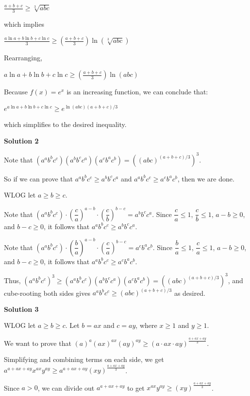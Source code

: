 \begin{enumerate}
 $\frac{a+b+c}{3}\ge \sqrt[3]{abc}$

 which implies

 $\frac{a\ln{a}+b\ln{b}+c\ln{c}}{3}\ge \left(\frac{a+b+c}{3}\right)\ln\left(\sqrt[3]{abc}\right)$

 Rearranging,

 $a\ln{a}+b\ln{b}+c\ln{c}\ge\left(\frac{a+b+c}{3}\right)\ln\left(abc\right)$

 Because $f(x) = e^x$ is an increasing function, we can conclude that:

 $e^{a\ln{a}+b\ln{b}+c\ln{c}}\ge{e}^{\ln\left(abc\right)(a+b+c)/3}$

 which simplifies to the desired inequality.

 



\textbf{Solution 2}

Note that $(a^ab^bc^c)(a^bb^cc^a)(a^cb^ac^b)=\left((abc)^{(a+b+c)/3}\right)^3$.

 So if we can prove that $a^ab^bc^c\ge a^bb^cc^a$ and $a^ab^bc^c\ge a^cb^ac^b$, then we are done.

 WLOG let $a\ge b\ge c$.

 Note that $(a^ab^bc^c)\cdot \left(\dfrac{c}{a}\right)^{a-b}\cdot \left(\dfrac{c}{b}\right)^{b-c}=a^bb^cc^a$. Since $\dfrac{c}{a} \le  1$, $\dfrac{c}{b} \le  1$, $a-b \ge 0$, and $b-c \ge 0$, it follows that $a^ab^bc^c \ge a^bb^cc^a$.

 Note that $(a^ab^bc^c)\cdot \left(\dfrac{b}{a}\right)^{a-b}\cdot \left(\dfrac{c}{a}\right)^{b-c}=a^cb^ac^b$. Since $\dfrac{b}{a} \le  1$, $\dfrac{c}{a} \le  1$, $a-b \ge 0$, and $b-c \ge 0$, it follows that $a^ab^bc^c \ge a^cb^ac^b$.

 Thus, $(a^ab^bc^c)^3\ge (a^ab^bc^c)(a^bb^cc^a)(a^cb^ac^b)=\left((abc)^{(a+b+c)/3}\right)^3$, and cube-rooting both sides gives $a^ab^bc^c\ge (abc)^{(a+b+c)/3}$ as desired.

 



\textbf{Solution 3}

WLOG let $a\ge b\ge c$. Let $b = ax$ and $c = ay$, where $x \ge 1$ and $y \ge 1$.

 We want to prove that $(a)^{a}(ax)^{ax}(ay)^{ay} \ge (a \cdot ax \cdot ay)^{\frac{a + ax + ay}{3}}$.

 Simplifying and combining terms on each side, we get $a^{a + ax + ay}x^{ax}y^{ay} \ge a^{a + ax + ay}(xy)^{\frac{a + ax + ay}{3}}$.

 Since $a > 0$, we can divide out $a^{a + ax + ay}$ to get $x^{ax}y^{ay} \ge (xy)^{\frac{a + ax + ay}{3}}$.


\end{enumerate}
